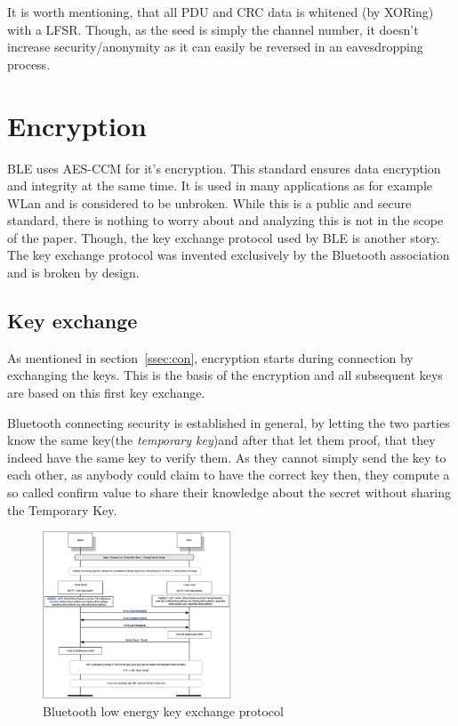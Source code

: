 \documentclass[conference]{IEEEtran}
\begin{document}
It is worth mentioning, that all PDU and CRC data is whitened (by XORing) with a LFSR. Though, as the seed is simply the channel number, it doesn't increase security/anonymity as it can easily be reversed in an eavesdropping process.

\section{Encryption}

BLE uses AES-CCM for it's encryption. This standard ensures data encryption and integrity at the same time. It is used in many applications as for example WLan and is considered to be unbroken. While this is a public and secure standard, there is nothing to worry about and analyzing this is not in the scope of the paper. Though, the key exchange protocol used by BLE is another story. The key exchange protocol was invented exclusively by the Bluetooth association and is broken by design.

\subsection{Key exchange}
\label{sub:key_exchange}

As mentioned in section~\ref{ssec:con}, encryption starts during connection by exchanging the keys. This is the basis of the encryption and all subsequent keys are based on this first key exchange.

Bluetooth connecting security is established in general, by letting the two parties know the same key(the \emph{temporary key})and after that let them proof, that they indeed have the same key to verify them. As they cannot simply send the key to each other, as anybody could claim to have the correct key then, they compute a so called confirm value to share their knowledge about the secret without sharing the Temporary Key.

\begin{figure}
  \centering
    \includegraphics[width=0.5\textwidth]{keyexchange}
    \caption{Bluetooth low energy key exchange protocol \cite{ble40}}
  \label{fig:keyexchange}
\end{figure}
\end{document}
